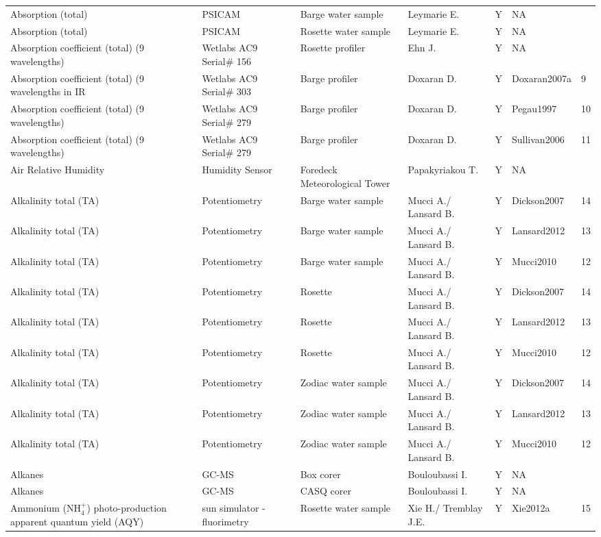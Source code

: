 \begin{ThreePartTable}
\begin{longtable}[t]{lllllll}
Absorption (total) & PSICAM & Barge water sample & Leymarie E. & Y & NA & \\
Absorption (total) & PSICAM & Rosette water sample & Leymarie E. & Y & NA & \\
Absorption coefficient (total) (9 wavelengths) & Wetlabs AC9 Serial\# 156 & Rosette profiler & Ehn J. & Y & NA & \\
Absorption coefficient (total) (9 wavelengths in IR & Wetlabs AC9 Serial\# 303 & Barge profiler & Doxaran D. & Y & Doxaran2007a & 9\\
\addlinespace
Absorption coefficient (total) (9 wavelengths) & Wetlabs AC9 Serial\# 279 & Barge profiler & Doxaran D. & Y & Pegau1997 & 10\\
Absorption coefficient (total) (9 wavelengths) & Wetlabs AC9 Serial\# 279 & Barge profiler & Doxaran D. & Y & Sullivan2006 & 11\\
Air Relative Humidity & Humidity Sensor & Foredeck Meteorological Tower & Papakyriakou T. & Y & NA & \\
Alkalinity total (TA) & Potentiometry & Barge water sample & Mucci A./ Lansard B. & Y & Dickson2007 & 14\\
Alkalinity total (TA) & Potentiometry & Barge water sample & Mucci A./ Lansard B. & Y & Lansard2012 & 13\\
\addlinespace
Alkalinity total (TA) & Potentiometry & Barge water sample & Mucci A./ Lansard B. & Y & Mucci2010 & 12\\
Alkalinity total (TA) & Potentiometry & Rosette & Mucci A./ Lansard B. & Y & Dickson2007 & 14\\
Alkalinity total (TA) & Potentiometry & Rosette & Mucci A./ Lansard B. & Y & Lansard2012 & 13\\
Alkalinity total (TA) & Potentiometry & Rosette & Mucci A./ Lansard B. & Y & Mucci2010 & 12\\
Alkalinity total (TA) & Potentiometry & Zodiac water sample & Mucci A./ Lansard B. & Y & Dickson2007 & 14\\
\addlinespace
Alkalinity total (TA) & Potentiometry & Zodiac water sample & Mucci A./ Lansard B. & Y & Lansard2012 & 13\\
Alkalinity total (TA) & Potentiometry & Zodiac water sample & Mucci A./ Lansard B. & Y & Mucci2010 & 12\\
Alkanes & GC-MS & Box corer & Bouloubassi I. & Y & NA & \\
Alkanes & GC-MS & CASQ corer & Bouloubassi I. & Y & NA & \\
Ammonium (NH$^+_4$) photo-production apparent quantum yield (AQY) & sun simulator - fluorimetry & Rosette water sample & Xie H./ Tremblay J.E. & Y & Xie2012a & 15\\

\end{longtable}
\end{ThreePartTable}
